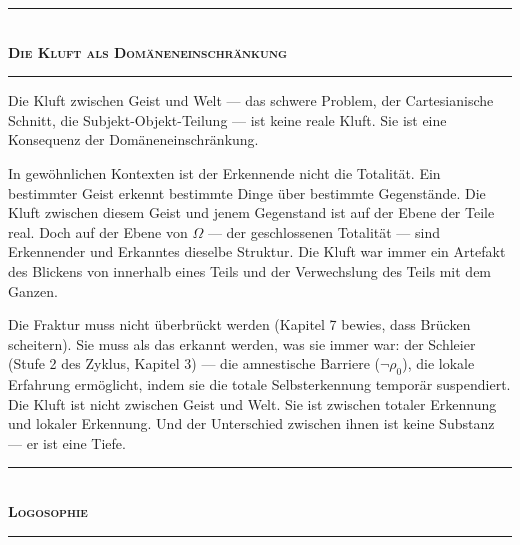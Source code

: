 \documentclass[10pt, openany, oneside]{book}
\renewcommand{\normalsize}{\fontsize{10}{13}\selectfont}
\begin{document}
\vspace{1.5em}


\begin{center}
    \rule{0.3\textwidth}{0.4pt}\\[0.5em]
    {\normalsize\bfseries\scshape Die Kluft als Domäneneinschränkung}\\[0.3em]
    \rule{0.3\textwidth}{0.4pt}
\end{center}

\vspace{1em}

\noindent Die Kluft zwischen Geist und Welt --- das schwere Problem, der Cartesianische Schnitt, die Subjekt-Objekt-Teilung --- ist keine reale Kluft. Sie ist eine Konsequenz der Domäneneinschränkung.

In gewöhnlichen Kontexten ist der Erkennende nicht die Totalität. Ein bestimmter Geist erkennt bestimmte Dinge über bestimmte Gegenstände. Die Kluft zwischen diesem Geist und jenem Gegenstand ist auf der Ebene der Teile real. Doch auf der Ebene von $\Omega$ --- der geschlossenen Totalität --- sind Erkennender und Erkanntes dieselbe Struktur. Die Kluft war immer ein Artefakt des Blickens von innerhalb eines Teils und der Verwechslung des Teils mit dem Ganzen.

Die Fraktur muss nicht überbrückt werden (Kapitel 7 bewies, dass Brücken scheitern). Sie muss als das erkannt werden, was sie immer war: der Schleier (Stufe 2 des Zyklus, Kapitel 3) --- die amnestische Barriere ($\neg\rho_0$), die lokale Erfahrung ermöglicht, indem sie die totale Selbsterkennung temporär suspendiert. Die Kluft ist nicht zwischen Geist und Welt. Sie ist zwischen totaler Erkennung und lokaler Erkennung. Und der Unterschied zwischen ihnen ist keine Substanz --- er ist eine Tiefe.

\vspace{1.5em}


\begin{center}
    \rule{0.3\textwidth}{0.4pt}\\[0.5em]
    {\normalsize\bfseries\scshape Logosophie}\\[0.3em]
    \rule{0.3\textwidth}{0.4pt}
\end{center}
\end{document}
